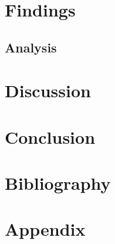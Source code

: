 \documentclass[11pt, a4paper, twoside]{report}
\begin{document}
\chapter{Findings}\label{findings}
\section{Analysis}\label{analysis}

\newpage

\chapter{Discussion}\label{Discuss}

\newpage

\chapter{Conclusion}\label{Conclude}

\newpage

\chapter{Bibliography}\label{Bib}

\newpage

\appendix

\chapter{Appendix}\label{Appen}
\end{document}
